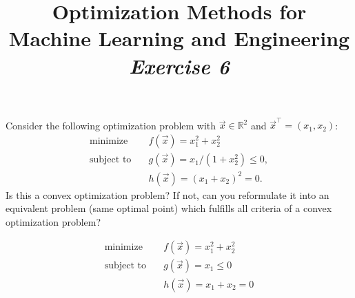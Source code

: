 



\author{}
\date{}
\title{Optimization Methods for \\Machine Learning and Engineering\\\vspace{0.5cm}\textit{Exercise 6}}
\maketitle


\setcounter{section}{6}
\setcounter{exercise}{0}





\begin{exercise}[subtitle={Paper}]
Consider the following optimization problem with $\vec{x}\in \mathbb{R}^2$ and $\vec{x}^\top = (x_1,x_2)$:
\begin{align*}
\text{minimize}\quad &f(\vec{x}) = x_1^2 + x_2^2\\
\text{subject to}\quad & g(\vec{x}) = x_1/(1+x_2^2)\leq 0,\\
& h(\vec{x}) = (x_1 + x_2)^2 = 0.
\end{align*}
Is this a convex optimization problem? If not, can you reformulate it into an equivalent problem (same optimal point) which fulfills all criteria of a convex optimization problem?
\end{exercise}


\begin{solution}[print=true]
\begin{align*}
\text{minimize}\quad &f(\vec{x}) = x_1^2 + x_2^2\\
\text{subject to}\quad & g(\vec{x}) = x_1\leq 0\\
& h(\vec{x}) = x_1 + x_2 = 0
\end{align*}
\end{solution}


